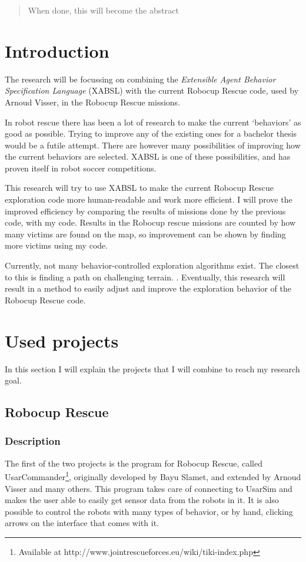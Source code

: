 \documentclass[a4paper,10pt]{article}
\begin{document}


\begin{abstract}
When done, this will become the abstract
\end{abstract}

\begin{multicols}{2}
\section{Introduction}
The research will be focussing on combining the \textit{Extensible Agent
Behavior Specification Language} (XABSL) with the current Robocup Rescue code, used
by Arnoud Visser, in the Robocup Rescue missions. 

In robot rescue there has been a lot of research to make the current `behaviors'
as good as possible. Trying to improve any of the existing ones for a bachelor thesis would be a
futile attempt. There are however many possibilities of improving how the
current behaviors are selected. XABSL is one of these possibilities, and has
proven itself in robot soccer competitions. \cite{lotzsch2004designing} \cite{loetzsch2006xabsl}

This research will try to use XABSL to make the current Robocup Rescue exploration code 
more human-readable and work more efficient. I will prove the improved
efficiency by comparing the results of missions done by the previous code, with
my code. Results in the Robocup rescue missions are counted by how many victims
are found on the map, so improvement can be shown by finding more victims using
my code.

Currently, not many behavior-controlled exploration algorithms exist. The
closest to this is finding a path on challenging terrain. 
\cite{seraji2002behavior} . Eventually, this research will result in a method to
easily adjust and improve the exploration behavior of the Robocup Rescue code.

\section{Used projects}
In this section I will explain the projects that I will combine to reach my research goal.

\subsection{Robocup Rescue}
\subsubsection{Description}
The first of the two projects is the program for Robocup Rescue, called
UsarCommander\footnote{Available at
http://www.jointrescueforces.eu/wiki/tiki-index.php}, originally developed by Bayu Slamet, and extended by Arnoud
Visser and many others. This program takes care of connecting to UsarSim and
makes the user able to easily get sensor data from the robots in it. It is also
possible to control the robots with many types of behavior, or by hand, clicking
arrows on the interface that comes with it.


\end{multicols}
\end{document}
